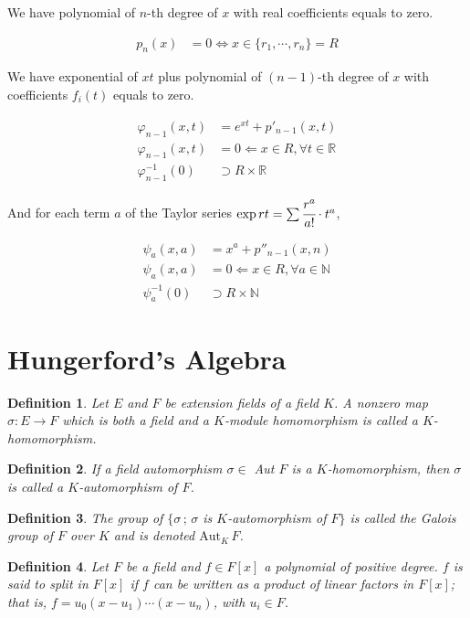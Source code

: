 \documentclass[11pt,a4paper]{article}
\newtheorem{definition}{Definition}
\begin{document}
We have polynomial of $n$-th degree of $x$ with real coefficients equals to zero.

\begin{align}
p_n(x) &= 0 \Leftrightarrow x \in \{ r_1, \cdots, r_n \} = R
\end{align}

We have exponential of $xt$ plus polynomial of $(n-1)$-th degree of $x$ with coefficients $f_i(t)$ equals to zero.

\begin{align}
\varphi_{n - 1}(x, t) &= e^{xt} + p'_{n-1}(x, t) \\
\varphi_{n - 1}(x, t) &= 0 \Leftarrow x \in R, \forall t \in \mathbb{R} \\
\varphi_{n - 1}^{-1}(0) &\supset R \times \mathbb{R}
\end{align}

And for each term $a$ of the Taylor series $\exp rt = \sum \cfrac{r^a}{a!} \cdot t^a$,

\begin{align}
\psi_a(x, a) &= x^a + p''_{n-1}(x, n) \\
\psi_a(x, a) &= 0 \Leftarrow x \in R, \forall a \in \mathbb{N} \\
\psi_a^{-1}(0) &\supset R \times \mathbb{N}
\end{align}

\section{Hungerford's Algebra}

\begin{definition}
Let $E$ and $F$ be extension fields of a field $K$. A nonzero map $\sigma: E \to F$ which is both a field and a $K$-module homomorphism is called a $K$-homomorphism.
\end{definition}

\begin{definition}
If a field automorphism $\sigma \in$ Aut $F$ is a $K$-homomorphism, then $\sigma$ is called a $K$-automorphism of $F$.
\end{definition}

\begin{definition}
The group of $\{\sigma\,;\, \sigma$ is $K$-automorphism of $F\}$ is called the Galois group of $F$ over $K$ and is denoted $\text{Aut}_K\,F$.
\end{definition}

\begin{definition}
Let $F$ be a field and $f \in F[x]$ a polynomial of positive degree. $f$ is said to split in $F[x]$ if $f$ can be written as a product of linear factors in $F[x]$; that is, $f = u_0(x - u_1)\cdots(x - u_n)$, with $u_i \in F$.
\end{definition}
\end{document}
